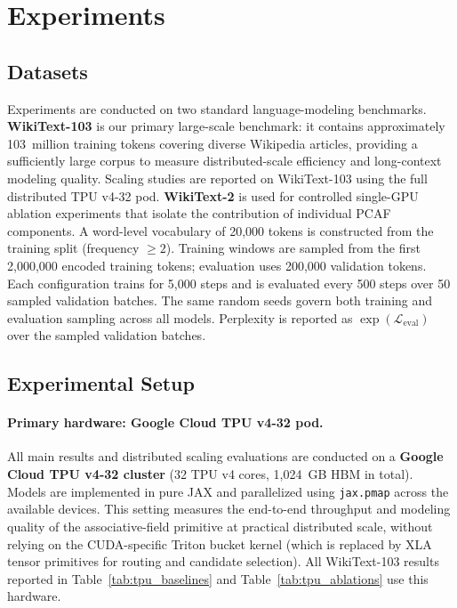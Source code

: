 \documentclass{article}
\begin{document}
\section{Experiments}

\subsection{Datasets}

Experiments are conducted on two standard language-modeling benchmarks.
\textbf{WikiText-103} \citep{merity2016pointer} is our primary large-scale
benchmark: it contains approximately 103~million training tokens covering
diverse Wikipedia articles, providing a sufficiently large corpus to measure
distributed-scale efficiency and long-context modeling quality. Scaling studies
are reported on WikiText-103 using the full distributed TPU v4-32 pod.
\textbf{WikiText-2} \citep{merity2016pointer} is used for controlled
single-GPU ablation experiments that isolate the contribution of individual
PCAF components. A word-level vocabulary of 20,000 tokens is constructed from
the training split (frequency $\geq 2$). Training windows are sampled from the
first 2,000,000 encoded training tokens; evaluation uses 200,000 validation
tokens. Each configuration trains for 5,000 steps and is evaluated every 500
steps over 50 sampled validation batches. The same random seeds govern both
training and evaluation sampling across all models. Perplexity is reported as
$\exp(\mathcal{L}_{\mathrm{eval}})$ over the sampled validation batches.

\subsection{Experimental Setup}

\paragraph{Primary hardware: Google Cloud TPU v4-32 pod.}
All main results and distributed scaling evaluations are conducted on a
\textbf{Google Cloud TPU v4-32 cluster} (32 TPU v4 cores, 1,024~GB HBM in
total). Models are implemented in pure JAX and parallelized using
\texttt{jax.pmap} across the available devices. This setting measures the
end-to-end throughput and modeling quality of the associative-field primitive
at practical distributed scale, without relying on the CUDA-specific Triton
bucket kernel (which is replaced by XLA tensor primitives for routing and
candidate selection). All WikiText-103 results reported in
Table~\ref{tab:tpu_baselines} and Table~\ref{tab:tpu_ablations} use this
hardware.
\end{document}
